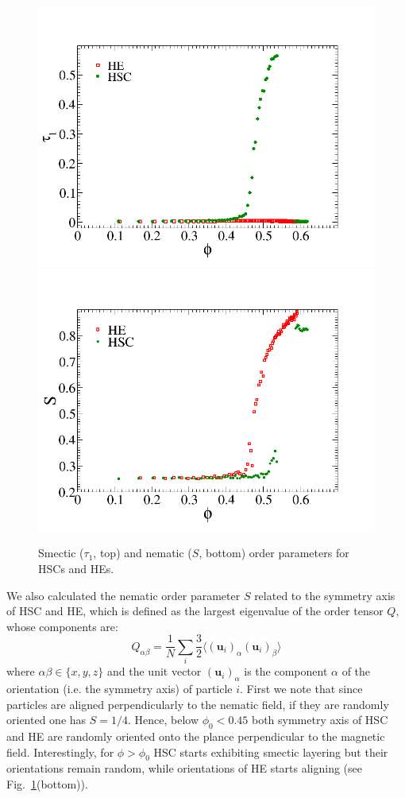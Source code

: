 \documentclass[aip,graphicx]{revtex4-1}
\begin{document}
\begin{figure}
    \centering
    \includegraphics[width=0.7\columnwidth]{smordpar.png}
    \includegraphics[width=0.7\columnwidth]{nemop.png}  
    \caption{Smectic ($\tau_1$, top) and nematic ($S$, bottom) order parameters for HSCs and HEs.}
    \label{fig:ordpars}
\end{figure}

We also calculated the nematic order parameter $S$ related to the symmetry axis of HSC and HE, which
is defined as the largest eigenvalue of the order tensor $Q$, whose components are:
\begin{equation}
Q_{\alpha\beta} = \frac{1}{N} \sum_i \frac{3}{2} \langle (\mathbf{u}_i)_\alpha (\mathbf{u}_i)_\beta\rangle
\label{eq:nemop}
\end{equation}
where $\alpha\beta\in\{x,y,z\}$ and the unit vector $(\mathbf{u}_i)_\alpha$ is the component $\alpha$ of the orientation (i.e. the symmetry axis) of particle $i$.
First we note that since particles are aligned perpendicularly to the nematic field, if they are 
randomly oriented one has $S=1/4$. Hence, below $\phi_0 < 0.45$ both symmetry axis of HSC and HE are 
randomly oriented onto the plance perpendicular to the magnetic field.
Interestingly, for $\phi > \phi_0$ HSC starts exhibiting smectic layering but their orientations
remain random, while orientations of HE starts aligning (see Fig.~\ref{fig:ordpars}(bottom)).
\end{document}
